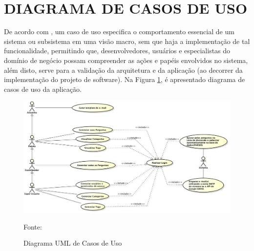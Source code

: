 \section{DIAGRAMA DE CASOS DE USO}

De acordo com , um caso de uso especifica o
comportamento essencial de um sistema ou subsistema em uma visão macro, sem que
haja a implementação de tal funcionalidade, permitindo que, desenvolvedores, 
usuários e especialistas do domínio de negócio possam compreender as ações e 
papéis envolvidos no sistema, além disto, serve para a validação da arquitetura 
e da aplicação (ao decorrer da implementação do projeto de software). Na Figura
\ref{fig:diagramaCasosDeUso}, é apresentado diagrama de casos de uso da aplicação.

\begin{figure}[h!tb]
	\caption{Diagrama UML de Casos de Uso}
	\label{fig:diagramaCasosDeUso}

	\centering
	\includegraphics[width=\textwidth]{images/usecase.png}

	\centering
	\footnotesize Fonte: \fonteOAutor
\end{figure}

\FloatBarrier 	%

